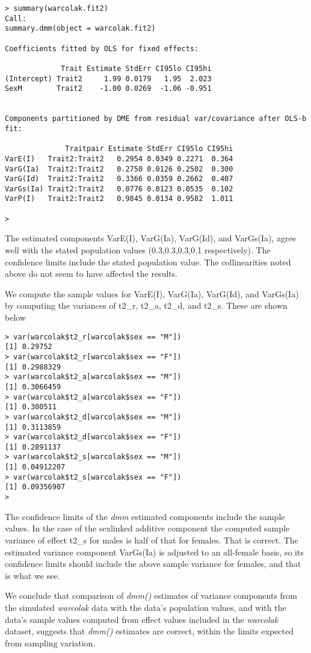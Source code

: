 \documentclass[titlepage]{article}  %
\begin{document}
\begin{verbatim}
> summary(warcolak.fit2)
Call:
summary.dmm(object = warcolak.fit2)

Coefficients fitted by OLS for fixed effects:

             Trait Estimate StdErr CI95lo CI95hi
(Intercept) Trait2     1.99 0.0179   1.95  2.023
SexM        Trait2    -1.00 0.0269  -1.06 -0.951


Components partitioned by DME from residual var/covariance after OLS-b fit:

              Traitpair Estimate StdErr CI95lo CI95hi
VarE(I)   Trait2:Trait2   0.2954 0.0349 0.2271  0.364
VarG(Ia)  Trait2:Trait2   0.2750 0.0126 0.2502  0.300
VarG(Id)  Trait2:Trait2   0.3366 0.0359 0.2662  0.407
VarGs(Ia) Trait2:Trait2   0.0776 0.0123 0.0535  0.102
VarP(I)   Trait2:Trait2   0.9845 0.0134 0.9582  1.011

> 
\end{verbatim}
The estimated components VarE(I), VarG(Ia), VarG(Id), and VarGs(Ia), agree well with the stated population values (0.3,0.3,0.3,0.1 respectively). The confidence limits include the stated population value. The collinearities noted above do not seem to have affected the results.

We compute the sample values for VarE(I), VarG(Ia), VarG(Id), and VarGs(Ia) by computing the variances of t2\_r, t2\_a, t2\_d, and t2\_s. These are shown below
\begin{verbatim}
> var(warcolak$t2_r[warcolak$sex == "M"])
[1] 0.29752
> var(warcolak$t2_r[warcolak$sex == "F"])
[1] 0.2988329
> var(warcolak$t2_a[warcolak$sex == "M"])
[1] 0.3066459
> var(warcolak$t2_a[warcolak$sex == "F"])
[1] 0.300511
> var(warcolak$t2_d[warcolak$sex == "M"])
[1] 0.3113859
> var(warcolak$t2_d[warcolak$sex == "F"])
[1] 0.2891137
> var(warcolak$t2_s[warcolak$sex == "M"])
[1] 0.04912207
> var(warcolak$t2_s[warcolak$sex == "F"])
[1] 0.09356907
> 
\end{verbatim}
The confidence limits of the {\em dmm} estimated components include the sample values. In the case of the sexlinked additive component the computed sample variance of effect t2\_s for males is half of that for females. That is correct. The estimated variance component VarGs(Ia) is adjusted to an all-female basis, so its confidence limits should include the above sample variance for females, and that is what we see. 


 We conclude that  comparison of {\em dmm()} estimates of variance components from the simulated {\em warcolak} data with the data's population values, and with the data's sample values computed from effect values included in the {\em warcolak} dataset, suggests that {\em dmm()} estimates are correct, within the limits expected from sampling variation.
\end{document}

